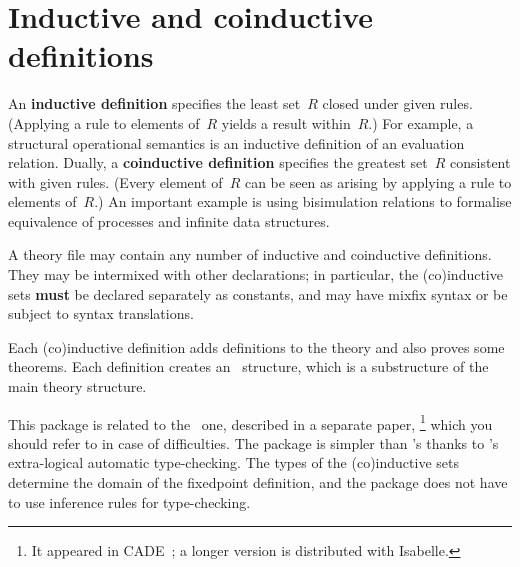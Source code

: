 \section{Inductive and coinductive definitions}

An {\bf inductive definition} specifies the least set~$R$ closed under given
rules.  (Applying a rule to elements of~$R$ yields a result within~$R$.)  For
example, a structural operational semantics is an inductive definition of an
evaluation relation.  Dually, a {\bf coinductive definition} specifies the
greatest set~$R$ consistent with given rules.  (Every element of~$R$ can be
seen as arising by applying a rule to elements of~$R$.)  An important example
is using bisimulation relations to formalise equivalence of processes and
infinite data structures.

A theory file may contain any number of inductive and coinductive
definitions.  They may be intermixed with other declarations; in
particular, the (co)inductive sets {\bf must} be declared separately as
constants, and may have mixfix syntax or be subject to syntax translations.

Each (co)inductive definition adds definitions to the theory and also
proves some theorems.  Each definition creates an \ML\ structure, which is a
substructure of the main theory structure.

This package is related to the \ZF\ one, described in a separate
paper,%
\footnote{It appeared in CADE~\cite{paulson-CADE}; a longer version is
  distributed with Isabelle.}  %
which you should refer to in case of difficulties.  The package is simpler
than \ZF's thanks to \HOL's extra-logical automatic type-checking.  The types
of the (co)inductive sets determine the domain of the fixedpoint definition,
and the package does not have to use inference rules for type-checking.


